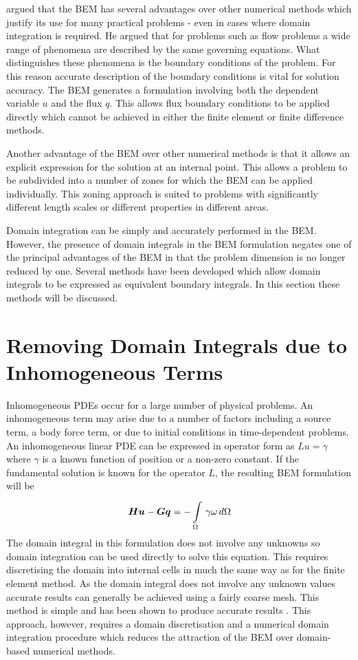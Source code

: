  argued that the BEM has several advantages over
other numerical methods which justify its use for many practical problems -
even in cases where domain integration is required.  He argued that for
problems such as flow problems a wide range of phenomena are described by
the same governing equations. What distinguishes these phenomena is the
boundary conditions of the problem.  For this reason accurate description
of the boundary conditions is vital for solution accuracy.  The BEM
generates a formulation involving both the dependent variable $u$ and the
flux $q$. This allows flux boundary conditions to be applied directly which
cannot be achieved in either the finite element or finite difference
methods.

Another advantage of the BEM over other numerical methods is that it allows an
explicit expression for the solution at an internal point.  This allows a
problem to be subdivided into a number of zones for which the BEM can be
applied individually.  This zoning approach is suited to problems with
significantly different length scales or different properties in different
areas.

Domain integration can be simply and accurately performed in the BEM.
However, the presence of domain integrals in the BEM formulation negates
one of the principal advantages of the BEM in that the problem dimension is
no longer reduced by one.  Several methods have been developed which allow
domain integrals to be expressed as equivalent boundary integrals. In this
section these methods will be discussed.

\section{Removing Domain Integrals due to Inhomogeneous Terms}

Inhomogeneous PDEs occur for a large number of physical problems.  An
inhomogeneous term may arise due to a number of factors including a source
term, a body force term, or due to initial conditions in time-dependent
problems.  An inhomogeneous linear PDE can be expressed in operator form as
$Lu = \gamma$ where $\gamma$ is a known function of position or a non-zero
constant.  If the fundamental solution is known for the operator $L$, the
resulting BEM formulation will be
\begin{equation}
  \matr{H} \vect{u} - \matr{G} \vect{q} = -\goneint{\gamma \omega}{\Omega}
\label{eq:inhomog}
\end{equation}
The domain integral in this formulation does not involve any unknowns so
domain integration can be used directly to solve this equation.  This
requires discretising the domain into internal cells in much the same way
as for the finite element method.  As the domain integral does not involve
any unknown values accurate results can generally be achieved using a
fairly coarse mesh.  This method is simple and has been shown to produce
accurate results \cite{brebbia:1984b}.  This approach, however, requires a
domain discretisation and a numerical domain integration procedure which
reduces the attraction of the BEM over domain-based numerical methods.

